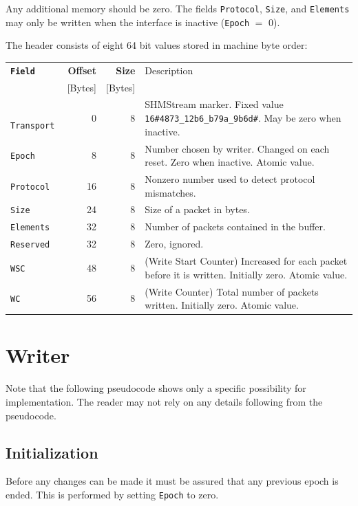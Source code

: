 \documentclass[a4paper,twoside,titlepage]{article}
\begin{document}
Any additional memory should be zero. The fields \texttt{Protocol},
\texttt{Size}, and \texttt{Elements} may only be written when the interface is
inactive (\texttt{Epoch} $=$ 0).

The header consists of eight 64 bit values stored in machine byte order:

\vspace{5mm}
\begin{tabularx}{\textwidth}{>{\tt}lrrX}
\toprule
\bf Field & \bf Offset & \bf Size  & Description \\
          & [Bytes]  & [Bytes] & \\
\midrule
Transport &  0 & 8 & SHMStream marker. Fixed value \texttt{16\#4873\_12b6\_b79a\_9b6d\#}. May be zero when inactive. \\
Epoch     &  8 & 8 & Number chosen by writer. Changed on each reset. Zero when inactive. Atomic value. \\
Protocol  & 16 & 8 & Nonzero number used to detect protocol mismatches. \\
Size      & 24 & 8 & Size of a packet in bytes. \\
Elements  & 32 & 8 & Number of packets contained in the buffer.\\
Reserved  & 32 & 8 & Zero, ignored. \\
WSC       & 48 & 8 & (Write Start Counter) Increased for each packet before it is written. Initially zero. Atomic value. \\
WC        & 56 & 8 & (Write Counter) Total number of packets written. Initially zero. Atomic value. \\
\bottomrule
\end{tabularx}

\section{Writer}

Note that the following pseudocode shows only a specific possibility for
implementation. The reader may not rely on any details following from the
pseudocode.

\subsection{Initialization}

Before any changes can be made it must be assured that any previous epoch is
ended. This is performed by setting \texttt{Epoch} to zero.
\end{document}
